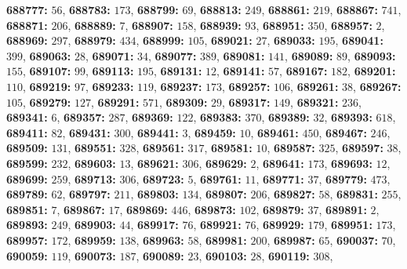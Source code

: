 \textsf{\bfseries 688777:} $56$, \textsf{\bfseries 688783:} $173$, \textsf{\bfseries 688799:} $69$, \textsf{\bfseries 688813:} $249$, \textsf{\bfseries 688861:} $219$, \textsf{\bfseries 688867:} $741$, \textsf{\bfseries 688871:} $206$, \textsf{\bfseries 688889:} $7$, \textsf{\bfseries 688907:} $158$, \textsf{\bfseries 688939:} $93$, \textsf{\bfseries 688951:} $350$, \textsf{\bfseries 688957:} $2$, \textsf{\bfseries 688969:} $297$, \textsf{\bfseries 688979:} $434$, \textsf{\bfseries 688999:} $105$, \textsf{\bfseries 689021:} $27$, \textsf{\bfseries 689033:} $195$, \textsf{\bfseries 689041:} $399$, \textsf{\bfseries 689063:} $28$, \textsf{\bfseries 689071:} $34$, \textsf{\bfseries 689077:} $389$, \textsf{\bfseries 689081:} $141$, \textsf{\bfseries 689089:} $89$, \textsf{\bfseries 689093:} $155$, \textsf{\bfseries 689107:} $99$, \textsf{\bfseries 689113:} $195$, \textsf{\bfseries 689131:} $12$, \textsf{\bfseries 689141:} $57$, \textsf{\bfseries 689167:} $182$, \textsf{\bfseries 689201:} $110$, \textsf{\bfseries 689219:} $97$, \textsf{\bfseries 689233:} $119$, \textsf{\bfseries 689237:} $173$, \textsf{\bfseries 689257:} $106$, \textsf{\bfseries 689261:} $38$, \textsf{\bfseries 689267:} $105$, \textsf{\bfseries 689279:} $127$, \textsf{\bfseries 689291:} $571$, \textsf{\bfseries 689309:} $29$, \textsf{\bfseries 689317:} $149$, \textsf{\bfseries 689321:} $236$, \textsf{\bfseries 689341:} $6$, \textsf{\bfseries 689357:} $287$, \textsf{\bfseries 689369:} $122$, \textsf{\bfseries 689383:} $370$, \textsf{\bfseries 689389:} $32$, \textsf{\bfseries 689393:} $618$, \textsf{\bfseries 689411:} $82$, \textsf{\bfseries 689431:} $300$, \textsf{\bfseries 689441:} $3$, \textsf{\bfseries 689459:} $10$, \textsf{\bfseries 689461:} $450$, \textsf{\bfseries 689467:} $246$, \textsf{\bfseries 689509:} $131$, \textsf{\bfseries 689551:} $328$, \textsf{\bfseries 689561:} $317$, \textsf{\bfseries 689581:} $10$, \textsf{\bfseries 689587:} $325$, \textsf{\bfseries 689597:} $38$, \textsf{\bfseries 689599:} $232$, \textsf{\bfseries 689603:} $13$, \textsf{\bfseries 689621:} $306$, \textsf{\bfseries 689629:} $2$, \textsf{\bfseries 689641:} $173$, \textsf{\bfseries 689693:} $12$, \textsf{\bfseries 689699:} $259$, \textsf{\bfseries 689713:} $306$, \textsf{\bfseries 689723:} $5$, \textsf{\bfseries 689761:} $11$, \textsf{\bfseries 689771:} $37$, \textsf{\bfseries 689779:} $473$, \textsf{\bfseries 689789:} $62$, \textsf{\bfseries 689797:} $211$, \textsf{\bfseries 689803:} $134$, \textsf{\bfseries 689807:} $206$, \textsf{\bfseries 689827:} $58$, \textsf{\bfseries 689831:} $255$, \textsf{\bfseries 689851:} $7$, \textsf{\bfseries 689867:} $17$, \textsf{\bfseries 689869:} $446$, \textsf{\bfseries 689873:} $102$, \textsf{\bfseries 689879:} $37$, \textsf{\bfseries 689891:} $2$, \textsf{\bfseries 689893:} $249$, \textsf{\bfseries 689903:} $44$, \textsf{\bfseries 689917:} $76$, \textsf{\bfseries 689921:} $76$, \textsf{\bfseries 689929:} $179$, \textsf{\bfseries 689951:} $173$, \textsf{\bfseries 689957:} $172$, \textsf{\bfseries 689959:} $138$, \textsf{\bfseries 689963:} $58$, \textsf{\bfseries 689981:} $200$, \textsf{\bfseries 689987:} $65$, \textsf{\bfseries 690037:} $70$, \textsf{\bfseries 690059:} $119$, \textsf{\bfseries 690073:} $187$, \textsf{\bfseries 690089:} $23$, \textsf{\bfseries 690103:} $28$, \textsf{\bfseries 690119:} $308$, 
